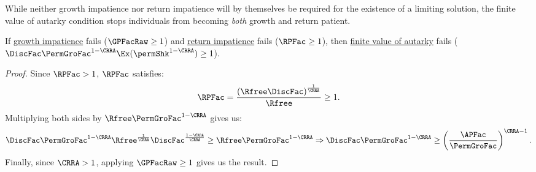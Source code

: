 \documentclass[BufferStockTheory]{subfiles}
\begin{document}
\begin{comment}
below stuff goes in growth section.
Strong growth impatience guarantees that the \textit{expectation} of normalized market resources becomes less than one market resources limit to infinity, since the condition will imply $\min \{\Ex\frac{\APFac}{\Rnd{\PermGroFac}}, \Ex\frac{R}{\Rnd{\PermGroFac}}\}< \GPFacMod<1$.


The growth impatience condition relates the \textit{expected} growth factor of permanent income to the \hyperlink{APFAC}{absolute patience factor}.
Following the discussion below Assumption \ref{ass:RIC}, the growth factor of the ratio of expected market resources to expected permanent income as $m$ limits to infinity becomes $\min \{\frac{\APFac}{\PermGroFac}, \frac{R}{\PermGroFac}\}$, and we have $\min \{\frac{\APFac}{\PermGroFac}, \frac{R}{\PermGroFac}\}< \GPFacRaw$.
Thus, growth impatience ensures the ratio of \textit{expected} market resources to \textit{expected} permanent income eventually falls as $\mNrm$ grows.
\end{comment}

While neither growth impatience nor return impatience will by themselves be required for the existence of a limiting solution, the finite value of autarky condition stops individuals from becoming \textit{both} growth and return patient.

\begin{claim}\label{claim:noRICGIC}
If \hyperlink{GIC}{growth impatience} fails ($\GPFacRaw  \geq 1$) and \hyperlink{RIC}{return impatience} fails ($\RPFac \geq 1$), then \hyperlink{FVAC}{finite value of autarky} fails ($\DiscFac \PermGroFac^{1-\CRRA}\Ex(\permShk^{1-\CRRA})\geq 1$). 
\end{claim}

\begin{proof}
Since $\RPFac  > 1$, $\RPFac $ satisfies:
%
%
\begin{equation}
\RPFac = \frac{\left(\Rfree\DiscFac\right)^{\frac{1}{\CRRA}}}{\Rfree}\geq 1.
\end{equation}
%
Multiplying both sides by $\Rfree\PermGroFac^{1-\CRRA}$ gives us:
%
\begin{equation}
\DiscFac\PermGroFac^{1-\CRRA}\Rfree^{\frac{1}{\CRRA}}\DiscFac^{\frac{1-\CRRA}{\CRRA}}{}\geq\Rfree \PermGroFac^{1-\CRRA} \Rightarrow \DiscFac\PermGroFac^{1-\CRRA}\geq\left(\frac{\APFac}{\PermGroFac}\right)^{\CRRA-1}.
\end{equation}
%
Finally, since $\CRRA>1$, applying $\GPFacRaw  \geq 1$ gives us the result.

\end{proof}
\end{document}
